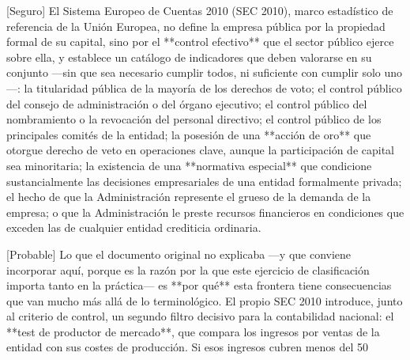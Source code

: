 \documentclass[10pt,a4paper]{article}
\begin{document}
[Seguro] El Sistema Europeo de Cuentas 2010 (SEC 2010), marco estadístico de referencia de la Unión Europea, no define la empresa pública por la propiedad formal de su capital, sino por el **control efectivo** que el sector público ejerce sobre ella, y establece un catálogo de indicadores que deben valorarse en su conjunto —sin que sea necesario cumplir todos, ni suficiente con cumplir solo uno—: la titularidad pública de la mayoría de los derechos de voto; el control público del consejo de administración o del órgano ejecutivo; el control público del nombramiento o la revocación del personal directivo; el control público de los principales comités de la entidad; la posesión de una **acción de oro** que otorgue derecho de veto en operaciones clave, aunque la participación de capital sea minoritaria; la existencia de una **normativa especial** que condicione sustancialmente las decisiones empresariales de una entidad formalmente privada; el hecho de que la Administración represente el grueso de la demanda de la empresa; o que la Administración le preste recursos financieros en condiciones que exceden las de cualquier entidad crediticia ordinaria.

[Probable] Lo que el documento original no explicaba —y que conviene incorporar aquí, porque es la razón por la que este ejercicio de clasificación importa tanto en la práctica— es **por qué** esta frontera tiene consecuencias que van mucho más allá de lo terminológico. El propio SEC 2010 introduce, junto al criterio de control, un segundo filtro decisivo para la contabilidad nacional: el **test de productor de mercado**, que compara los ingresos por ventas de la entidad con sus costes de producción. Si esos ingresos cubren menos del 50%
\end{document}

